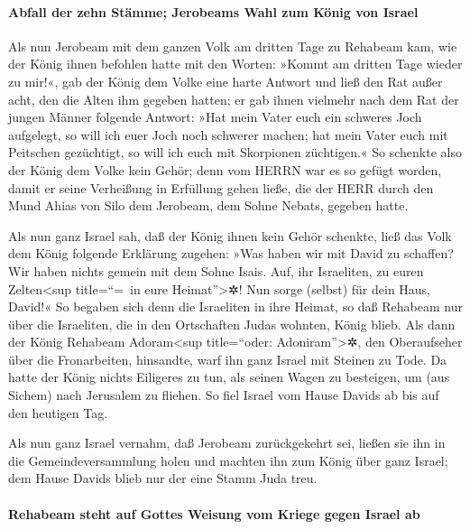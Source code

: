 \hypertarget{abfall-der-zehn-stuxe4mme-jerobeams-wahl-zum-kuxf6nig-von-israel}{%
\paragraph{Abfall der zehn Stämme; Jerobeams Wahl zum König von
Israel}\label{abfall-der-zehn-stuxe4mme-jerobeams-wahl-zum-kuxf6nig-von-israel}}

Als nun Jerobeam mit dem ganzen Volk am dritten Tage zu
Rehabeam kam, wie der König ihnen befohlen hatte mit den Worten: »Kommt
am dritten Tage wieder zu mir!«, gab der König dem Volke
eine harte Antwort und ließ den Rat außer acht, den die Alten ihm
gegeben hatten; er gab ihnen vielmehr nach dem Rat der
jungen Männer folgende Antwort: »Hat mein Vater euch ein schweres Joch
aufgelegt, so will ich euer Joch noch schwerer machen; hat mein Vater
euch mit Peitschen gezüchtigt, so will ich euch mit Skorpionen
züchtigen.« So schenkte also der König dem Volke kein
Gehör; denn vom HERRN war es so gefügt worden, damit er seine Verheißung
in Erfüllung gehen ließe, die der HERR durch den Mund Ahias von Silo dem
Jerobeam, dem Sohne Nebats, gegeben hatte.

Als nun ganz Israel sah, daß der König ihnen kein Gehör
schenkte, ließ das Volk dem König folgende Erklärung zugehen: »Was haben
wir mit David zu schaffen? Wir haben nichts gemein mit dem Sohne Isais.
Auf, ihr Israeliten, zu euren Zelten\textless sup title=``=~in eure
Heimat''\textgreater✲! Nun sorge (selbst) für dein Haus, David!« So
begaben sich denn die Israeliten in ihre Heimat, so daß
Rehabeam nur über die Israeliten, die in den Ortschaften Judas wohnten,
König blieb. Als dann der König Rehabeam
Adoram\textless sup title=``oder: Adoniram''\textgreater✲, den
Oberaufseher über die Fronarbeiten, hinsandte, warf ihn ganz Israel mit
Steinen zu Tode. Da hatte der König nichts Eiligeres zu tun, als seinen
Wagen zu besteigen, um (aus Sichem) nach Jerusalem zu fliehen.
So fiel Israel vom Hause Davids ab bis auf den heutigen
Tag.

Als nun ganz Israel vernahm, daß Jerobeam zurückgekehrt
sei, ließen sie ihn in die Gemeindeversammlung holen und machten ihn zum
König über ganz Israel; dem Hause Davids blieb nur der eine Stamm Juda
treu.

\hypertarget{rehabeam-steht-auf-gottes-weisung-vom-kriege-gegen-israel-ab}{%
\paragraph{Rehabeam steht auf Gottes Weisung vom Kriege gegen Israel
ab}\label{rehabeam-steht-auf-gottes-weisung-vom-kriege-gegen-israel-ab}}

